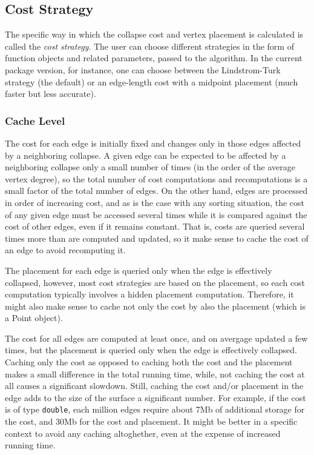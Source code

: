 \subsection{Cost Strategy}

The specific way in which the collapse cost and vertex placement is calculated is called the {\em cost strategy}.
The user can choose different strategies in the form of function objects and related parameters, passed to the algorithm.
In the current package version, for instance, one can choose between the Lindstrom-Turk strategy (the default) or an edge-length cost with a midpoint placement (much faster but less accurate).

\subsubsection{Cache Level}

The cost for each edge is initially fixed and changes only in those edges affected by a neighboring collapse. A given edge can be expected to be affected by a neighboring collapse only a small number of times (in the order of the average vertex degree), so the total number of cost computations and recomputations is a small factor of the total number of edges. On the other hand, edges are processed in order of increasing cost, and as is the case with any sorting situation, the cost of any given edge must be accessed several times while it is compared against the cost of other edges, even if it remains constant. That is, costs are queried several times more than are computed and updated, so it make sense to cache the cost of an edge to avoid recomputing it.

The placement for each edge is queried only when the edge is effectively collapsed, however, most cost strategies are based on the placement, so each cost computation typically involves a hidden placement computation. Therefore, it might also make sense to cache not only the cost by also the placement (which is a Point object).

The cost for all edges are computed at least once, and on avergage updated a few times, but the placement is queried only when the edge is effectively collapsed. Caching only the cost as opposed to caching both the cost and the placement makes a small difference in the total running time, while, not caching the cost at all causes a significant slowdown. Still, caching the cost and/or placement in the edge adds to the size of the surface a significant number. For example, if the cost is of type {\tt double}, each million edges require about 7Mb of additional storage for the cost, and 30Mb for the cost and placement. It might be better in a specific context to avoid any caching altoghether, even at the expense of increased running time.


